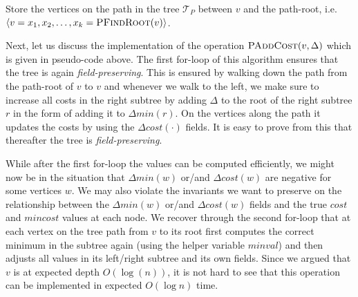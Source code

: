 \begin{algorithm}
  \SetAlgoLined
  \DontPrintSemicolon
  Store the vertices on the path in the tree $\mathcal{T}_{P}$ between $v$ and the path-root, i.e. $\langle v = x_1, x_2, \ldots, x_k = \textsc{PFindRoot}(v)\rangle$.\\
  
  \caption{$\textsc{PAddCost}(v, \Delta)$}
\end{algorithm}

Next, let us discuss the implementation of the operation $\textsc{PAddCost}(v, \Delta)$ which is given in pseudo-code above. The first for-loop of this algorithm ensures that the tree is again \emph{field-preserving}. This is ensured by walking down the path from the path-root of $v$ to $v$ and whenever we walk to the left, we make sure to increase all costs in the right subtree by adding $\Delta$ to the root of the right subtree $r$ in the form of adding it to $\Delta min(r)$. On the vertices along the path it updates the costs by using the $\Delta cost(\cdot)$ fields. It is easy to prove from this that thereafter the tree is  \emph{field-preserving}.

While after the first for-loop the values can be computed efficiently, we might now be in the situation that $\Delta min(w)$ or/and $\Delta cost(w)$ are negative for some vertices $w$. We may also  violate the invariants we want to preserve on the relationship between the $\Delta min(w)$ or/and $\Delta cost(w)$ fields and the true $cost$ and $mincost$ values at each node. We recover through the second for-loop that at each vertex on the tree path from $v$ to its root first computes the correct minimum in the subtree again (using the helper variable $\textit{minval}$) and then adjusts all values in its left/right subtree and its own fields. Since we argued that $v$ is at expected depth $O(\log(n))$, it is not hard to see that this operation can be implemented in expected $O(\log n)$ time.


